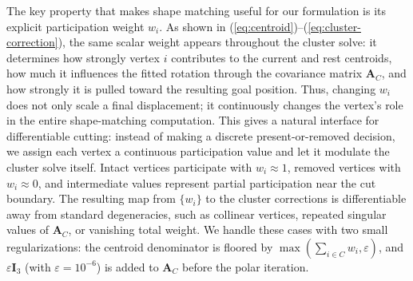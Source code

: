 \documentclass[letterpaper, 10 pt, conference]{ieeeconf}  %
\theoremstyle{tight}
\begin{document}
The key property that makes shape matching useful for our formulation is its
explicit participation weight $w_i$. As shown in
(\ref{eq:centroid})--(\ref{eq:cluster-correction}), the same scalar weight
appears throughout the cluster solve: it determines how strongly vertex $i$
contributes to the current and rest centroids, how much it influences the
fitted rotation through the covariance matrix $\mathbf{A}_C$, and how strongly
it is pulled toward the resulting goal position. Thus, changing $w_i$ does not
only scale a final displacement; it continuously changes the vertex's role in
the entire shape-matching computation.
This gives a natural interface for differentiable cutting: instead of making a
discrete present-or-removed decision, we assign each vertex a continuous
participation value and let it modulate the cluster solve itself. Intact
vertices participate with $w_i\approx1$, removed vertices with $w_i\approx0$,
and intermediate values represent partial participation near the cut boundary.
The resulting map from $\{w_i\}$ to the cluster corrections is differentiable
away from standard degeneracies, such as collinear vertices, repeated singular
values of $\mathbf{A}_C$, or vanishing total weight. We handle these cases
with two small regularizations: the centroid denominator is floored by
$\max(\sum_{i\in C} w_i,\varepsilon)$, and
$\varepsilon\mathbf{I}_3$ (with $\varepsilon=10^{-6}$) is added to $\mathbf{A}_C$ before the polar
iteration.
\end{document}
